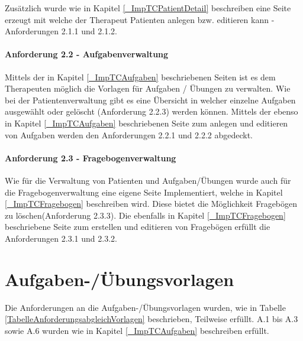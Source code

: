Zusätzlich wurde wie in Kapitel \ref{_ImpTCPatientDetail} beschreiben eine Seite erzeugt mit welche der Therapeut Patienten anlegen bzw. editieren kann - Anforderungen 2.1.1 und 2.1.2.

\paragraph{Anforderung 2.2 - Aufgabenverwaltung}
Mittels der in Kapitel \ref{_ImpTCAufgaben} beschriebenen Seiten ist es dem Therapeuten möglich die Vorlagen für Aufgaben / Übungen zu verwalten. Wie bei der Patientenverwaltung gibt es eine Übersicht in welcher einzelne Aufgaben ausgewählt oder gelöscht (Anforderung 2.2.3) werden können. Mittels der ebenso in Kapitel \ref{_ImpTCAufgaben} beschriebenen Seite zum anlegen und editieren von Aufgaben werden den Anforderungen 2.2.1 und 2.2.2 abgedeckt.

\paragraph{Anforderung 2.3 - Fragebogenverwaltung}
Wie für die Verwaltung von Patienten und Aufgaben/Übungen wurde auch für die Fragebogenverwaltung eine eigene Seite Implementiert, welche in Kapitel \ref{_ImpTCFragebogen} beschreiben wird. Diese bietet die Möglichkeit Fragebögen zu löschen(Anforderung 2.3.3). Die ebenfalls in Kapitel \ref{_ImpTCFragebogen} beschriebene Seite zum erstellen und editieren von Fragebögen erfüllt die Anforderungen 2.3.1 und 2.3.2.

\section{Aufgaben-/Übungsvorlagen}
Die Anforderungen an die Aufgaben-/Übungsvorlagen wurden, wie in Tabelle \ref{TabelleAnforderungsabgleichVorlagen} beschrieben, Teilweise erfüllt.
A.1 bis A.3 sowie A.6 wurden wie in Kapitel \ref{_ImpTCAufgaben} beschreiben erfüllt. 

